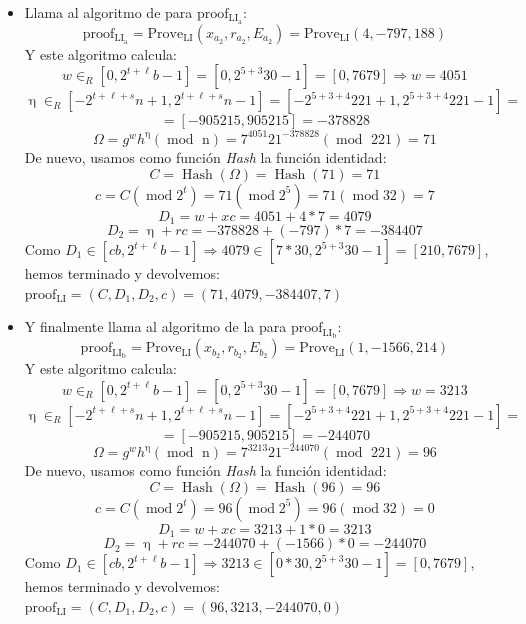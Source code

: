 \begin{itemize}
    \item Llama al algoritmo de  para $\operatorname{proof_{LI_{a}}}$:
    $$\operatorname{proof_{LI_{a}}} = \operatorname{Prove_{LI}}(x_{a_{2}}, r_{a_{2}}, E_{a_{2}}) = \operatorname{Prove_{LI}}(4, -797, 188)$$
    Y este algoritmo calcula:
    $$w \in_{R} [0, 2^{t+\ell}b-1] = [0, 2^{5+3}30-1] = [0, 7679] \Rightarrow w = 4051$$
    $$\upeta \in_{R} [-2^{t+\ell+s}n+1, 2^{t+\ell+s}n-1] = [-2^{5+3+4}221+1, 2^{5+3+4}221-1] =$$ $$= [-905215, 905215] = -378828$$
    $$\Omega = g^{w}h^{\upeta} (\operatorname{mod} \text{ n}) = 7^{4051}21^{-378828} (\operatorname{mod} \text{ 221}) = 71$$
    De nuevo, usamos como función \emph{Hash} la función identidad:
    $$C = \operatorname{Hash}(\Omega) = \operatorname{Hash}(71) = 71$$
    $$c = C (\operatorname{mod} 2^{t}) = 71 (\operatorname{mod} 2^{5}) = 71 (\operatorname{mod} 32) = 7$$
    $$D_{1} = w + xc = 4051 + 4 * 7 = 4079$$
    $$D_{2} = \upeta + rc = -378828 + (-797) * 7 = -384407$$
    Como $D_{1} \in [cb, 2^{t+\ell}b-1] \Rightarrow 4079 \in [7 * 30, 2^{5+3}30-1] = [210, 7679]$, hemos terminado y devolvemos: $\operatorname{proof_{LI}} = (C, D_{1}, D_{2}, c) = (71, 4079, -384407, 7)$
    
    \item Y finalmente llama al algoritmo de la  para $\operatorname{proof_{LI_{b}}}$:
    $$\operatorname{proof_{LI_{b}}} = \operatorname{Prove_{LI}}(x_{b_{2}}, r_{b_{2}}, E_{b_{2}}) = \operatorname{Prove_{LI}}(1, -1566, 214)$$
    Y este algoritmo calcula:
    $$w \in_{R} [0, 2^{t+\ell}b-1] = [0, 2^{5+3}30-1] = [0, 7679] \Rightarrow w = 3213$$
    $$\upeta \in_{R} [-2^{t+\ell+s}n+1, 2^{t+\ell+s}n-1] = [-2^{5+3+4}221+1, 2^{5+3+4}221-1] =$$ $$= [-905215, 905215] = -244070$$
    $$\Omega = g^{w}h^{\upeta} (\operatorname{mod} \text{ n}) = 7^{3213}21^{-244070} (\operatorname{mod} \text{ 221}) = 96$$
    De nuevo, usamos como función \emph{Hash} la función identidad:
    $$C = \operatorname{Hash}(\Omega) = \operatorname{Hash}(96) = 96$$
    $$c = C (\operatorname{mod} 2^{t}) = 96 (\operatorname{mod} 2^{5}) = 96 (\operatorname{mod} 32) = 0$$
    $$D_{1} = w + xc = 3213 + 1 * 0 = 3213$$
    $$D_{2} = \upeta + rc =  -244070 + (-1566) * 0 = -244070$$
    Como $D_{1} \in [cb, 2^{t+\ell}b-1] \Rightarrow 3213 \in [0 * 30, 2^{5+3}30-1] = [0, 7679]$, hemos terminado y devolvemos: $\operatorname{proof_{LI}} = (C, D_{1}, D_{2}, c) = (96, 3213, -244070, 0)$
    

\end{itemize}
